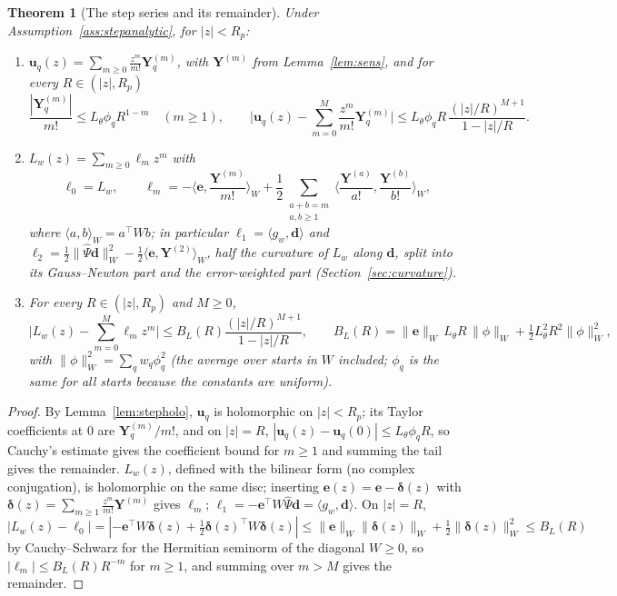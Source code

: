 \documentclass[11pt]{article}
\newtheorem{theorem}{Theorem}
\theoremstyle{definition}
\theoremstyle{remark}
\newcommand{\uu}{\mathbf{u}}
\newcommand{\ee}{\mathbf{e}}
\newcommand{\Psih}{\hat\Psi}
\begin{document}
\begin{theorem}[The step series and its remainder]\label{thm:stepseries}
Under Assumption~\ref{ass:stepanalytic}, for $|z|<R_p$:
\begin{enumerate}
\item $\uu_q(z)=\sum_{m\ge0}\frac{z^m}{m!}\mathbf Y^{(m)}_q$, with $\mathbf Y^{(m)}$ from Lemma~\ref{lem:sens}, and for every $R\in(|z|,R_p)$
\[
\frac{|\mathbf Y^{(m)}_q|}{m!}\le L_\theta\phi_qR^{1-m}\quad(m\ge1),\qquad
\Big|\uu_q(z)-\sum_{m=0}^M\frac{z^m}{m!}\mathbf Y^{(m)}_q\Big|\le L_\theta\phi_qR\,\frac{(|z|/R)^{M+1}}{1-|z|/R}.
\]
\item $L_w(z)=\sum_{m\ge0}\ell_mz^m$ with
\[
\ell_0=L_w,\qquad \ell_m=-\Big\langle\ee,\frac{\mathbf Y^{(m)}}{m!}\Big\rangle_W+\frac12\sum_{\substack{a+b=m\\ a,b\ge1}}\Big\langle\frac{\mathbf Y^{(a)}}{a!},\frac{\mathbf Y^{(b)}}{b!}\Big\rangle_W,
\]
where $\langle a,b\rangle_W=a^\top Wb$; in particular $\ell_1=\langle g_w,\mathbf d\rangle$ and $\ell_2=\tfrac12\|\Psih\mathbf d\|_W^2-\tfrac12\langle\ee,\mathbf Y^{(2)}\rangle_W$, half the curvature of $L_w$ along $\mathbf d$, split into its Gauss--Newton part and the error-weighted part (Section~\ref{sec:curvature}).
\item For every $R\in(|z|,R_p)$ and $M\ge0$,
\[
\Big|L_w(z)-\sum_{m=0}^M\ell_mz^m\Big|\le B_L(R)\frac{(|z|/R)^{M+1}}{1-|z|/R},\qquad B_L(R)=\|\ee\|_W\,L_\theta R\,\|\phi\|_W+\tfrac12L_\theta^2R^2\|\phi\|_W^2,
\]
with $\|\phi\|_W^2=\sum_qw_q\phi_q^2$ (the average over starts in $W$ included; $\phi_q$ is the same for all starts because the constants are uniform).
\end{enumerate}
\end{theorem}

\begin{proof}
By Lemma~\ref{lem:stepholo}, $\uu_q$ is holomorphic on $|z|<R_p$; its Taylor coefficients at $0$ are $\mathbf Y^{(m)}_q/m!$, and on $|z|=R$, $|\uu_q(z)-\uu_q(0)|\le L_\theta\phi_qR$, so Cauchy's estimate gives the coefficient bound for $m\ge1$ and summing the tail gives the remainder.
$L_w(z)$, defined with the bilinear form (no complex conjugation), is holomorphic on the same disc; inserting $\ee(z)=\ee-\bm\delta(z)$ with $\bm\delta(z)=\sum_{m\ge1}\frac{z^m}{m!}\mathbf Y^{(m)}$ gives $\ell_m$; $\ell_1=-\ee^\top W\Psih\mathbf d=\langle g_w,\mathbf d\rangle$.
On $|z|=R$, $|L_w(z)-\ell_0|=|{-\ee^\top W\bm\delta(z)}+\tfrac12\bm\delta(z)^\top W\bm\delta(z)|\le\|\ee\|_W\|\bm\delta(z)\|_W+\tfrac12\|\bm\delta(z)\|_W^2\le B_L(R)$ by Cauchy--Schwarz for the Hermitian seminorm of the diagonal $W\ge0$, so $|\ell_m|\le B_L(R)R^{-m}$ for $m\ge1$, and summing over $m>M$ gives the remainder.
\end{proof}
\end{document}
